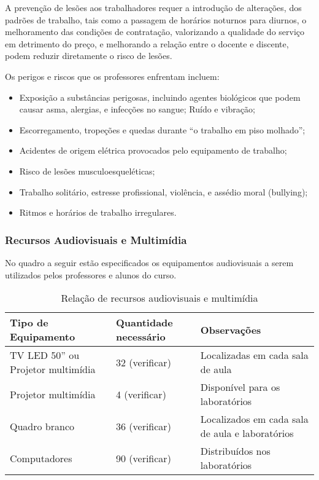 A prevenção de lesões aos trabalhadores requer a introdução de alterações, dos padrões de trabalho, tais como a passagem de horários noturnos para diurnos, o melhoramento das condições de contratação, valorizando a qualidade do serviço em detrimento do preço, e melhorando a relação entre o docente e discente, podem reduzir diretamente o risco de les\~oes.

Os perigos e riscos que os professores enfrentam incluem:

\begin{itemize}
\item Exposição a substâncias perigosas, incluindo agentes biológicos que podem causar asma, alergias, e infecções no sangue;
Ruído e vibração;
\item Escorregamento, tropeções e quedas durante ``o trabalho em piso molhado'';
\item Acidentes de origem elétrica provocados pelo equipamento de trabalho;
\item Risco de lesões musculoesqueléticas;
\item Trabalho solitário, estresse profissional, violência, e assédio moral (bullying);
\item Ritmos e horários de trabalho irregulares.
\end{itemize}

\subsubsection{Recursos Audiovisuais e Multim\'idia}

No quadro a seguir estão especificados os equipamentos audiovisuais a serem utilizados pelos professores e alunos do curso.

\begin{table}[h]
\caption{Rela\c{c}\~ao de recursos audiovisuais e multim\'idia}
\begin{center}
\begin{tabular}{|p{4.5cm}|p{2.5cm}|p{4.5cm}|}
\hline
Tipo de Equipamento & Quantidade necess\'ario & Observa\c{c}\~oes\\
\hline 
\hline
TV LED 50'' ou Projetor multim\'idia & 32 (verificar) &  Localizadas em cada sala de aula\\
\hline
Projetor multim\'idia &  4 (verificar) & Dispon\'ivel para os laborat\'orios \\
\hline
Quadro branco & 36 (verificar) & Localizados em cada sala de aula e laborat\'orios \\
\hline
Computadores & 90 (verificar) & Distribu\'idos nos laborat\'orios \\
\hline
\end{tabular} 
\end{center}
\label{tab:pl}
\end{table}

